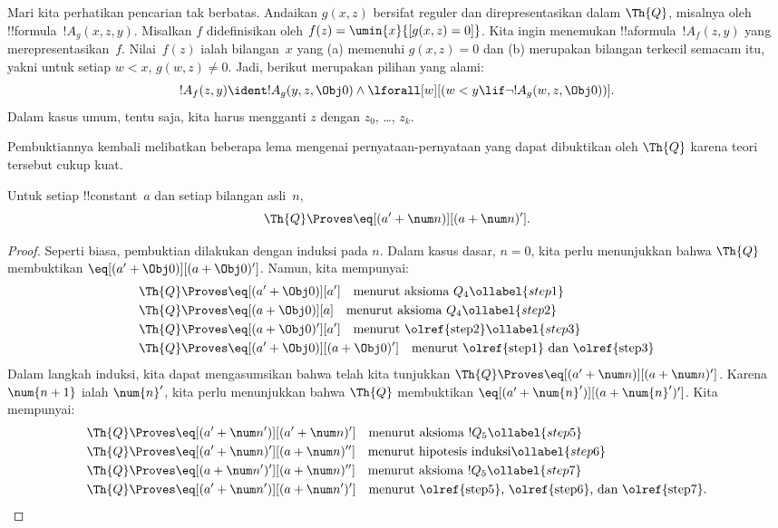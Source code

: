 \documentclass[../../../include/open-logic-section]{subfiles}
\begin{document}

Mari kita perhatikan pencarian tak berbatas. Andaikan $g(x, z)$ bersifat
reguler dan direpresentasikan dalam $\Th{Q}$, misalnya oleh
!!{formula}~$!A_g(x, z, y)$. Misalkan $f$ didefinisikan oleh
$f(z) = \umin{x}{[g(x, z) = 0]}$. Kita ingin menemukan
!!a{formula}~$!A_f(z, y)$ yang merepresentasikan~$f$. Nilai~$f(z)$ ialah
bilangan~$x$ yang (a) memenuhi $g(x, z) = 0$ dan (b) merupakan bilangan
terkecil semacam itu, yakni untuk setiap $w < x$, $g(w, z) \neq 0$. Jadi,
berikut merupakan pilihan yang alami:
\[
!A_f(z,y) \ident !A_g(y, z, \Obj 0) \land \lforall[w][(w < y \lif \lnot
  !A_g(w, z, \Obj 0))].
\]
Dalam kasus umum, tentu saja, kita harus mengganti $z$ dengan $z_0$, \dots,
$z_k$.

Pembuktiannya kembali melibatkan beberapa lema mengenai pernyataan-pernyataan
yang dapat dibuktikan oleh $\Th{Q}$ karena teori tersebut cukup kuat.

\begin{lem}
 Untuk setiap !!{constant}~$a$ dan setiap bilangan
asli~$n$,
\[
\Th{Q} \Proves \eq[(a' + \num n)][(a + \num n)'].
\]
\end{lem}

\begin{proof}
Seperti biasa, pembuktian dilakukan dengan induksi pada $n$. Dalam kasus
dasar, $n = 0$, kita perlu menunjukkan bahwa $\Th{Q}$ membuktikan
$\eq[(a' + \Obj 0)][(a + \Obj 0)']$. Namun, kita mempunyai:
\begin{align}
  \Th{Q} & \Proves \eq[(a' + \Obj 0)][a'] \quad
  \text{menurut aksioma $Q_4$} \ollabel{step1}\\
  \Th{Q} & \Proves  \eq[(a + \Obj 0)][a] \quad
  \text{menurut aksioma $Q_4$} \ollabel{step2} \\
  \Th{Q} & \Proves \eq[(a + \Obj 0)'][a'] \quad
  \text{menurut \olref{step2}} \ollabel{step3} \\
  \Th{Q} & \Proves \eq[(a' + \Obj 0)][(a + \Obj 0)'] \quad
  \text{menurut \olref{step1} dan \olref{step3}}\notag
\end{align}
Dalam langkah induksi, kita dapat mengasumsikan bahwa telah kita tunjukkan
$\Th{Q} \Proves \eq[(a' + \num n)][(a + \num n)']$. Karena
$\num{n+1}$ ialah $\num{n}'$, kita perlu menunjukkan bahwa $\Th{Q}$
membuktikan $\eq[(a' + \num{n}')][(a + \num{n}')']$. Kita mempunyai:
\begin{align}
  \Th{Q} & \Proves \eq[(a' + \num n')][(a' + \num n)'] \quad
  \text{menurut aksioma $!Q_5$} \ollabel{step5}\\
  \Th{Q} & \Proves \eq[(a' + \num n)'][(a + \num n)''] \quad
  \text{menurut hipotesis induksi} \ollabel{step6}\\
  \Th{Q} & \Proves \eq[(a + \num n')'][(a + \num n)''] \quad
  \text{menurut aksioma $!Q_5$} \ollabel{step7}\\
  \Th{Q} & \Proves \eq[(a' + \num n')][(a + \num n')'] \quad
  \text{menurut \olref{step5}, \olref{step6}, dan \olref{step7}.} \notag
\end{align}
\end{proof}
\end{document}
